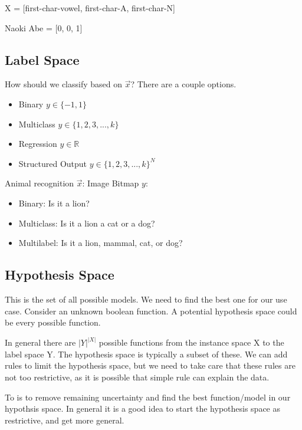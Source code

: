 \begin{example}
    
    X = [first-char-vowel, first-char-A, first-char-N]

    Naoki Abe = [0, 0, 1]
\end{example}

\subsection*{Label Space}
How should we classify based on $\vec{x}$? There are a couple options.
\begin{itemize}
    \item Binary $y \in \{-1, 1\}$
    \item Multiclass $y \in \{1, 2, 3, ..., k\}$
    \item Regression $y \in \mathbb{R}$ 
    \item Structured Output $y \in \{1, 2, 3, ..., k\}^N$
\end{itemize}
\begin{example}
    Animal recognition
    $\vec{x}$: Image Bitmap
    $y$:
    \begin{itemize}
        \item Binary: Is it a lion?
        \item Multiclass: Is it a lion a cat or a dog?
        \item Multilabel: Is it a lion, mammal, cat, or dog?
    \end{itemize}
\end{example}

\subsection*{Hypothesis Space}
This is the set of all possible models. We need to find the best one for our use case. Consider an unknown boolean function. A potential hypothesis space could be every possible function.

In general there are $|Y|^|X|$ possible functions from the instance space X to the label space Y. The hypothesis space is typically a subset of these. We can add rules to limit the hypothesis space, but we need to take care that these rules are not too restrictive, as it is possible that  simple rule can explain the data.

To  is to remove remaining uncertainty and find the best function/model in our hypothsis space. In general it is a good idea to start the hypothesis space as restrictive, and get more general.

